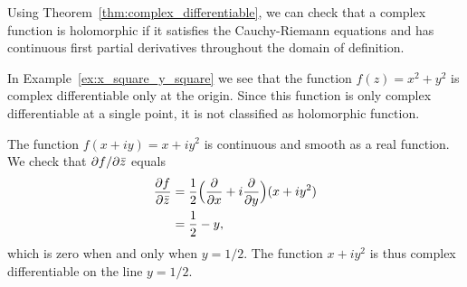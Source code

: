 Using Theorem~\ref{thm:complex_differentiable}, we can check that a complex function is holomorphic if it satisfies the Cauchy-Riemann equations and has continuous first partial derivatives throughout the domain of definition.


In Example~\ref{ex:x_square_y_square} we see that the function $f(z) = x^2+y^2$ is complex differentiable only at the origin. Since this function is only complex differentiable at a single point, it is not classified as holomorphic function.

\begin{example}
	The function $f(x+iy) = x+iy^2$ is continuous and smooth as a real function. 
	We check that $\partial f /\partial \bar{z}$ equals
	\begin{align*}
		\frac{\partial f}{\partial \bar{z} } &=  \frac{1}{2} \Big( \frac{\partial }{\partial x} + i \frac{\partial }{\partial y}\Big) (x+iy^2) \\
		&= \frac{1}{2} - y,
	\end{align*}
	which is zero when and only when $y=1/2$. The function $x+iy^2$ is thus complex differentiable on the line $y=1/2$. \label{ex:non_holomorphic}
\end{example}








